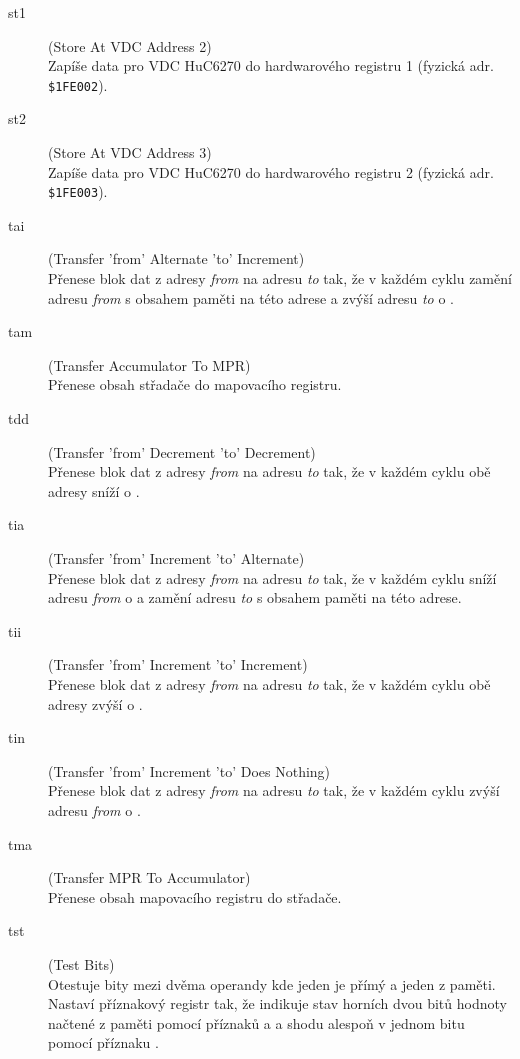\begin{description}
\item[{\sc st1}] (Store At VDC Address 2) \\
	Zapíše data pro VDC HuC6270 do hardwarového registru 1 (fyzická adr. {\tt \$1FE002}).

\item[{\sc st2}] (Store At VDC Address 3) \\
	Zapíše data pro VDC HuC6270 do hardwarového registru 2 (fyzická adr. {\tt \$1FE003}).

\item[{\sc tai}] (Transfer 'from' Alternate 'to' Increment) \\
	Přenese blok dat z adresy {\it from} na adresu {\it to} tak, že v každém cyklu
	zamění adresu {\it from} s obsahem paměti na této adrese a zvýší adresu
	{\it to} o .

\item[{\sc tam}] (Transfer Accumulator To MPR) \\
	Přenese obsah střadače do mapovacího registru.

\item[{\sc tdd}] (Transfer 'from' Decrement 'to' Decrement) \\
	Přenese blok dat z adresy {\it from} na adresu {\it to} tak, že v každém cyklu
	obě adresy sníží o .

\item[{\sc tia}] (Transfer 'from' Increment 'to' Alternate) \\
	Přenese blok dat z adresy {\it from} na adresu {\it to} tak, že v každém cyklu
	sníží adresu {\it from} o  a zamění adresu {\it to} s obsahem paměti
	na této adrese.

\item[{\sc tii}] (Transfer 'from' Increment 'to' Increment) \\
	Přenese blok dat z adresy {\it from} na adresu {\it to} tak, že v každém cyklu
	obě adresy zvýší o .

\item[{\sc tin}] (Transfer 'from' Increment 'to' Does Nothing) \\
	Přenese blok dat z adresy {\it from} na adresu {\it to} tak, že v každém cyklu
	zvýší adresu {\it from} o .

\item[{\sc tma}] (Transfer MPR To Accumulator) \\
	Přenese obsah mapovacího registru do střadače.

\item[{\sc tst}] (Test Bits) \\
	Otestuje bity mezi dvěma operandy kde jeden je přímý a jeden z paměti.
	Nastaví příznakový registr tak, že indikuje stav horních dvou bitů hodnoty
	načtené z paměti pomocí příznaků  a  a shodu alespoň v jednom
	bitu pomocí příznaku .
\end{description}

